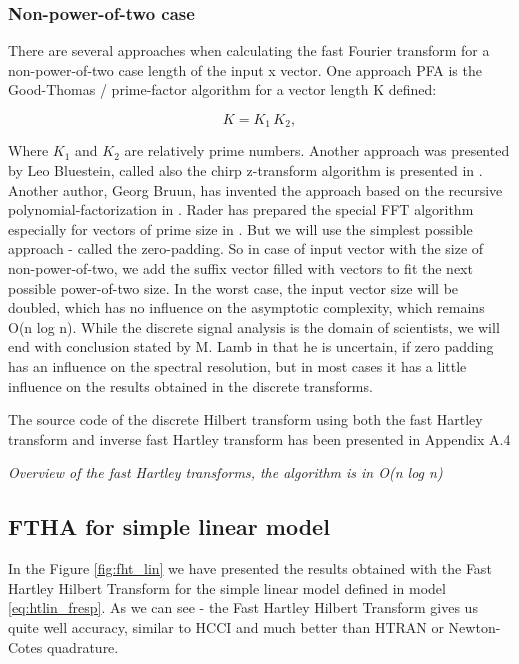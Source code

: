 \documentclass[12pt,twoside,a4paper]{article}
\numberwithin{equation}{subsection}
\numberwithin{figure}{subsection}
\begin{document}
\subsubsection*{Non-power-of-two case}

There are several approaches when calculating the fast Fourier transform for a non-power-of-two case length of the input x vector. 
One approach PFA is the Good-Thomas \cite{Good_interaction} / prime-factor algorithm for a vector length K defined:

\begin{equation}  \label{eq:hartley_goodk}
  K={K_{1}}\,{K_{2}},
\end{equation}

Where ${K_{1}}$ and ${K_{2}}$ are relatively prime numbers. Another approach was presented by Leo Bluestein, called also the chirp
z-transform algorithm is presented in \cite{bluestein_linear}. Another author, Georg Bruun, has invented the approach based on
the recursive polynomial-factorization in \cite{bruun_ztransform}. Rader has prepared the special FFT algorithm especially for
vectors of prime size in \cite{rader_dicrete}. But we will use the simplest possible approach - called the zero-padding. So in case
of input vector with the size of non-power-of-two, we add the suffix vector filled with vectors to fit the next possible
power-of-two size. In the worst case, the input vector size will be doubled, which has no influence on the asymptotic complexity,
which remains O(n log n). While the discrete signal analysis is the domain of scientists, we will end with conclusion stated by M.
Lamb in \cite{lamb_issues} that he is uncertain, if zero padding has an influence on the spectral resolution, but in most cases it
has a little influence on the results obtained in the discrete transforms.

The source code of the discrete Hilbert transform using both the fast Hartley transform and inverse fast Hartley transform has been
presented in Appendix A.4

\textit{Overview of the fast Hartley transforms, the algorithm is in O(n log n)}

\subsection{FTHA for simple linear model} \label{chap:hartley_lin}

In the Figure \ref{fig:fht_lin} we have presented the results obtained with the Fast Hartley Hilbert Transform for the simple
linear model defined in model \ref{eq:htlin_fresp}. As we can see - the Fast Hartley Hilbert Transform gives us quite well accuracy,
similar to HCCI and much better than HTRAN or Newton-Cotes quadrature. 
\end{document}
